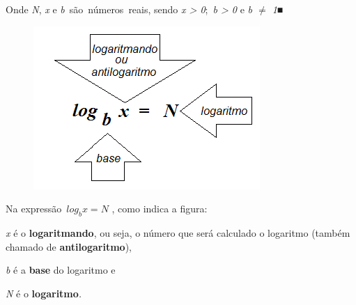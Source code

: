 \documentclass[12pt]{article}
\begin{document}
\begin{enumerate}[label*={\fontsize{14pt}{14pt}\selectfont \textbf{\arabic*.}}]
\begin{justify}
Onde \textit{N}, \textit{x} e \textit{b}\ são\ números\ reais, sendo    \textit{x > 0};\  \textit{b > 0} e \textit{b $ \neq $  1}■
\end{justify}\par




\begin{figure}[H]
	\begin{Center}
		\includegraphics[width=3.39in,height=2.44in]{./media/image2.png}
	\end{Center}
\end{figure}



\par

\begin{justify}
Na expressão\   \( log_{b}x=N \) , como indica a figura:
\end{justify}\par

\begin{justify}
\textit{x} é o \textbf{logaritmando}, ou seja, o número que será calculado o logaritmo (também chamado de \textbf{antilogaritmo}),
\end{justify}\par

\begin{justify}
\textit{b }é a \textbf{base} do logaritmo e
\end{justify}\par

\begin{justify}
\textit{N }é o \textbf{logaritmo}\textit{.}
\end{justify}\par



\end{enumerate}
\end{document}
